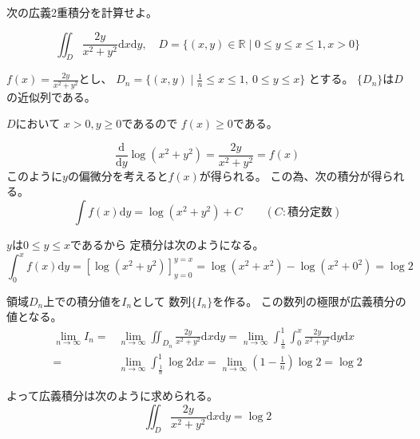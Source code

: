 \documentclass[12pt,b5paper]{ltjsarticle}
\begin{document}
\hrulefill

次の広義2重積分を計算せよ。

\begin{equation}
 \iint_{D}\frac{2y}{x^2+y^2}\mathrm{d}x\mathrm{d}y,
  \quad
  D=\{(x,y)\in\mathbb{R} \mid 0\leq y \leq x \leq 1 , x > 0\}
\end{equation}

\dotfill

$\displaystyle f(x)=\frac{2y}{x^2+y^2}$とし、
$D_{n}=\{ (x,y) \mid \frac{1}{n} \leq x \leq 1,\ 0\leq y \leq x \}$
とする。
$\{D_n\}$は$D$の近似列である。

$D$において
$x>0,y\geq0$であるので
$f(x)\geq0$である。

\begin{center}

 \begin{equation}
  \frac{\mathrm{d}}{\mathrm{d}y} \log(x^2+y^2)
   = \frac{2y}{x^2+y^2}
   = f(x)
 \end{equation}
 このように$y$の偏微分を考えると$f(x)$が得られる。
 この為、次の積分が得られる。
 \begin{equation}
  \int f(x) \mathrm{d}y = \log(x^2+y^2) +C
   \qquad (C:\text{積分定数})
 \end{equation}
\end{center}

$y$は$0 \leq y \leq x$であるから
定積分は次のようになる。
\begin{equation}
 \int_{0}^{x}f(x)\mathrm{d}y
  = \left[ \log(x^2+y^2) \right]_{y=0}^{y=x}
  = \log(x^2+x^2) - \log(x^2+0^2)
  = \log 2
\end{equation}

領域$D_{n}$上での積分値を$I_{n}$として
数列$\{ I_{n} \}$を作る。
この数列の極限が広義積分の値となる。
\begin{align}
 \lim_{n\to\infty}I_{n}
  =& \lim_{n\to\infty}
  \iint_{D_{n}} \frac{2y}{x^2+y^2} \mathrm{d}x\mathrm{d}y
  = \lim_{n\to\infty}
  \int _{\frac{1}{n}}^{1}\int_{0}^{x} \frac{2y}{x^2+y^2} \mathrm{d}y\mathrm{d}x\\
 =& \lim_{n\to\infty}
  \int _{\frac{1}{n}}^{1} \log2 \mathrm{d}x
 = \lim_{n\to\infty}
 \left( 1-\frac{1}{n} \right)\log2
 = \log 2
\end{align}

よって広義積分は次のように求められる。
\begin{equation}
 \iint_{D} \frac{2y}{x^2+y^2} \mathrm{d}x\mathrm{d}y
  =\log 2
\end{equation}


\hrulefill
\end{document}
